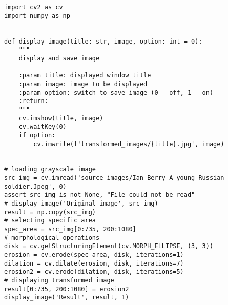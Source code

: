 \begin{lstlisting}[caption={Исходный код функции для минимизации дефектов надписи }, label={lst:line_compute}]
import cv2 as cv
import numpy as np


def display_image(title: str, image, option: int = 0):
    """
    display and save image

    :param title: displayed window title
    :param image: image to be displayed
    :param option: switch to save image (0 - off, 1 - on)
    :return:
    """
    cv.imshow(title, image)
    cv.waitKey(0)
    if option:
        cv.imwrite(f'transformed_images/{title}.jpg', image)


# loading grayscale image
src_img = cv.imread('source_images/Ian_Berry_A young_Russian soldier.Jpeg', 0)
assert src_img is not None, "File could not be read"
# display_image('Original image', src_img)
result = np.copy(src_img)
# selecting specific area
spec_area = src_img[0:735, 200:1080]
# morphological operations
disk = cv.getStructuringElement(cv.MORPH_ELLIPSE, (3, 3))
erosion = cv.erode(spec_area, disk, iterations=1)
dilation = cv.dilate(erosion, disk, iterations=7)
erosion2 = cv.erode(dilation, disk, iterations=5)
# displaying transformed image
result[0:735, 200:1080] = erosion2
display_image('Result', result, 1)
        \end{lstlisting}
